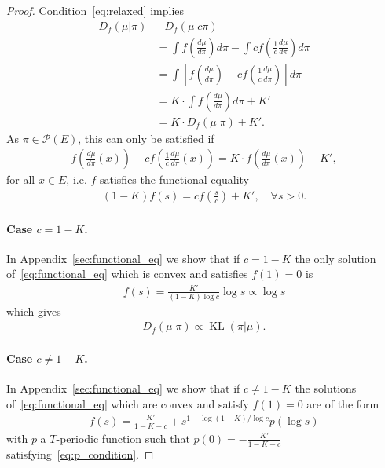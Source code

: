 \documentclass[10pt,a4paper]{amsart}
\newcommand{\KL}{\mathop{\mathrm{KL}}\nolimits}
\newcommand{\X}{E}
\newcommand{\cP}{\mathcal P}
\begin{document}
\begin{proof}


Condition~\eqref{eq:relaxed} implies
\begin{align*}
D_f(\mu | \pi) &- D_f(\mu | c\pi)\\
&= \int f\left(\frac{d\mu}{d\pi}\right)d\pi
- \int c f\left(\frac{1}{c}\frac{d\mu}{d\pi}\right) d\pi \\
&= \int \left[
f\left(\frac{d\mu}{d\pi}\right)
- c f\left(\frac{1}{c}\frac{d\mu}{d\pi}\right)
\right] d\pi\\
&= K\cdot \int f\left(\frac{d\mu}{d\pi}\right)d\pi +K'\\
&=K \cdot D_f(\mu |\pi) + K'.
\end{align*}
As $\pi\in\cP(\X)$, this can only be satisfied if
\begin{align*}
    f\left(\frac{d\mu}{d\pi}(x)\right)-c f\left(\frac{1}{c}\frac{d\mu}{d\pi}(x)\right) = K\cdot f\left(\frac{d\mu}{d\pi}(x)\right)+K',
\end{align*}
for all $x\in \X$, i.e. $f$ satisfies the functional equality
\begin{align}
\label{eq:functional_eq}
    (1-K)f(s) 
= c f\!\left(\frac{s}{c}\right)+K', \quad \forall s>0.
\end{align}

\paragraph*{Case $c=1-K$.}
In Appendix~\ref{sec:functional_eq} we show that if $c=1-K$ the only solution of~\eqref{eq:functional_eq} which is convex and satisfies $f(1)=0$ is
\begin{align*}
    f(s)=\frac{K'}{(1-K) \log c}\log s \propto \log s
\end{align*}
which gives
\begin{align*}
    D_f(\mu|\pi) \propto \KL(\pi|\mu).
\end{align*}

\paragraph*{Case $c\neq 1-K$.}
In Appendix~\ref{sec:functional_eq} we show that if $c\neq 1-K$ the solutions of~\eqref{eq:functional_eq} which are convex and satisfy $f(1)=0$ are of the form 
\begin{align*}
    f(s)= \frac{K'}{1-K-c} + s^{1-\log (1-K)/\log c} p(\log s)
\end{align*}
with $p$ a $T$-periodic function such that $p(0) = -\frac{K'}{1-K-c}$ satisfying~\eqref{eq:p_condition}.

\end{proof}
\end{document}
